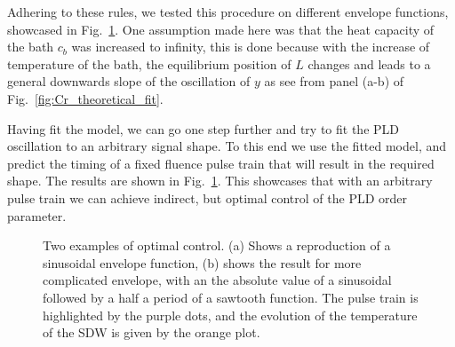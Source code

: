 Adhering to these rules, we tested this procedure on different envelope functions, showcased in Fig.~\ref{fig:Cr_control}.
One assumption made here was that the heat capacity of the bath $c_b$ was increased to infinity, this is done because with the increase of temperature of the bath, the equilibrium position of $L$ changes and leads to a general downwards slope of the oscillation of $y$ as see from panel (a-b) of Fig.~\ref{fig:Cr_theoretical_fit}.

Having fit the model, we can go one step further and try to fit the PLD oscillation to an arbitrary signal shape. To this end we use the fitted model, and predict the timing of a fixed fluence pulse train that will result in the required shape. The results are shown in Fig.~\ref{fig:Cr_control}. This showcases that with an arbitrary pulse train we can achieve indirect, but optimal control of the PLD order parameter.
\begin{figure}
	\caption{\label{fig:Cr_control} Two examples of optimal control. (a) Shows a reproduction of a sinusoidal envelope function, (b) shows the result for more complicated envelope, with an the absolute value of a sinusoidal followed by a half a period of a sawtooth function. The pulse train is highlighted by the purple dots, and the evolution of the temperature of the SDW is given by the orange plot.}
\end{figure}

\printbibliography

